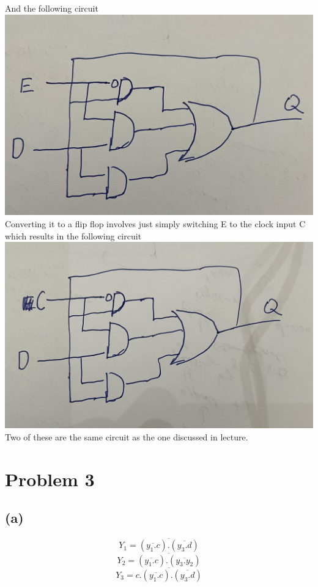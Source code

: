 \documentclass[12pt]{article}
\begin{document}
And the following circuit\\
\includegraphics[scale=0.25]{Fig4.jpg}\\
Converting it to a flip flop involves just simply switching
E to the clock input C which results in the following circuit\\
\includegraphics[scale=0.25]{Fig5.jpg}\\

Two of these are the same circuit as the one discussed in lecture.
\section*{Problem 3}
\subsection*{(a)}
$$Y_1=\overline{(\overline{y_1.c}).(\overline{y_3.d})}$$
$$Y_2=\overline{(\overline{y_1.c}).(\overline{y_3.y_2})}$$
$$Y_3=\overline{c.(\overline{y_1.c}).(\overline{y_3.d})}$$
\end{document}
